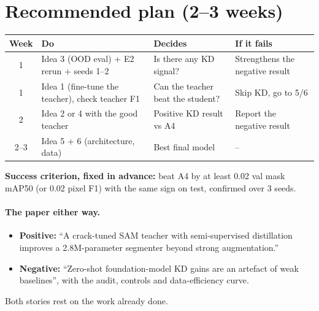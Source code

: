 \documentclass[11pt,a4paper]{article}
\begin{document}
\section{Recommended plan (2--3 weeks)}
\begin{center}\small
\begin{tabular}{clll}
\toprule
Week & Do & Decides & If it fails\\
\midrule
1 & Idea 3 (OOD eval) + E2 rerun + seeds 1--2 & Is there any KD signal? & Strengthens the negative result\\
1 & Idea 1 (fine-tune the teacher), check teacher F1 & Can the teacher beat the student? & Skip KD, go to 5/6\\
2 & Idea 2 or 4 with the good teacher & Positive KD result vs A4 & Report the negative result\\
2--3 & Idea 5 + 6 (architecture, data) & Best final model & --\\
\bottomrule
\end{tabular}\end{center}
\textbf{Success criterion, fixed in advance:} beat A4 by at least 0.02 val mask mAP50 (or 0.02 pixel F1) with the same sign on test,
confirmed over 3 seeds.

\paragraph{The paper either way.}
\begin{itemize}
\item \textbf{Positive:} ``A crack-tuned SAM teacher with semi-supervised distillation improves a 2.8M-parameter
segmenter beyond strong augmentation.''
\item \textbf{Negative:} ``Zero-shot foundation-model KD gains are an artefact of weak baselines'', with the audit, controls and data-efficiency curve.
\end{itemize}
Both stories rest on the work already done.
\end{document}
